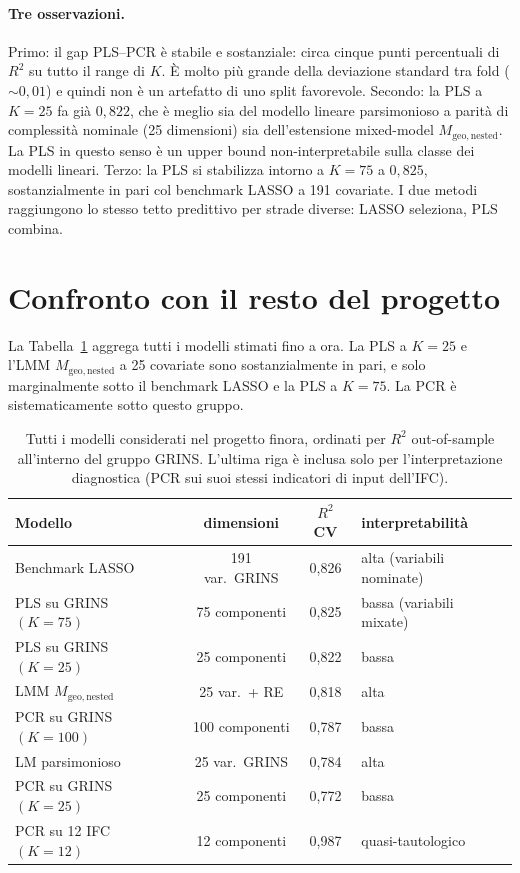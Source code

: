 \documentclass[11pt,a4paper]{article}
\begin{document}
\paragraph{Tre osservazioni.}
Primo: il gap PLS--PCR è stabile e sostanziale: circa cinque punti
percentuali di \(R^{2}\) su tutto il range di \(K\). È molto più
grande della deviazione standard tra fold (\(\sim 0{,}01\)) e
quindi non è un artefatto di uno split favorevole. Secondo: la
PLS a \(K = 25\) fa già \(0{,}822\), che è meglio sia del modello
lineare parsimonioso a parità di complessità nominale (25
dimensioni) sia dell'estensione mixed-model
\(M_{\mathrm{geo,nested}}\). La PLS in questo senso è un upper
bound non-interpretabile sulla classe dei modelli lineari. Terzo:
la PLS si stabilizza intorno a \(K = 75\) a \(0{,}825\),
sostanzialmente in pari col benchmark LASSO a 191 covariate. I due
metodi raggiungono lo stesso tetto predittivo per strade diverse:
LASSO seleziona, PLS combina.

\section{Confronto con il resto del progetto}

La Tabella~\ref{tab:all} aggrega tutti i modelli stimati fino a
ora. La PLS a \(K=25\) e l'LMM \(M_{\mathrm{geo,nested}}\) a 25
covariate sono sostanzialmente in pari, e solo marginalmente sotto
il benchmark LASSO e la PLS a \(K=75\). La PCR è
sistematicamente sotto questo gruppo.

\begin{table}[h!]
  \centering
  \begin{tabular}{l c c l}
    \toprule
    Modello & dimensioni & \(R^{2}\) CV & interpretabilità \\
    \midrule
    Benchmark LASSO              & 191 var.\ GRINS & 0,826 & alta (variabili nominate) \\
    PLS su GRINS \((K = 75)\)    & 75 componenti   & 0,825 & bassa (variabili mixate) \\
    PLS su GRINS \((K = 25)\)    & 25 componenti   & 0,822 & bassa \\
    LMM \(M_{\mathrm{geo,nested}}\) & 25 var.\ + RE & 0,818 & alta \\
    PCR su GRINS \((K = 100)\)   & 100 componenti  & 0,787 & bassa \\
    LM parsimonioso              & 25 var.\ GRINS  & 0,784 & alta \\
    PCR su GRINS \((K = 25)\)    & 25 componenti   & 0,772 & bassa \\
    PCR su 12 IFC \((K = 12)\)   & 12 componenti   & 0,987 & quasi-tautologico \\
    \bottomrule
  \end{tabular}
  \caption{Tutti i modelli considerati nel progetto finora,
    ordinati per \(R^{2}\) out-of-sample all'interno del gruppo
    GRINS. L'ultima riga è inclusa solo per l'interpretazione
    diagnostica (PCR sui suoi stessi indicatori di input dell'IFC).}
  \label{tab:all}
\end{table}
\end{document}
